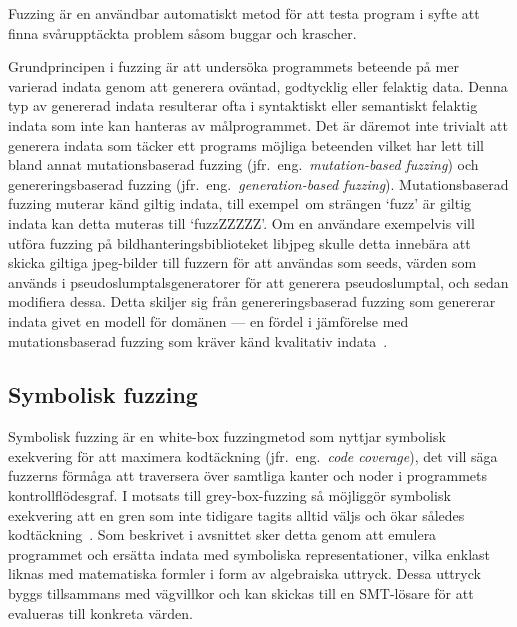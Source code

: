 Fuzzing är en användbar automatiskt metod för att testa program i syfte att finna
svårupptäckta problem såsom buggar och krascher.

Grundprincipen i fuzzing är att undersöka programmets beteende på mer varierad
indata genom att generera oväntad, godtycklig eller felaktig data. Denna typ av
genererad indata resulterar ofta i syntaktiskt eller semantiskt felaktig indata
som inte kan hanteras av målprogrammet. Det är däremot inte trivialt att generera
indata som täcker ett programs möjliga beteenden vilket har lett till bland annat
mutationsbaserad fuzzing (jfr.\ eng.\ \emph{mutation-based fuzzing}) och genereringsbaserad
fuzzing (jfr.\ eng.\ \emph{generation-based fuzzing}). Mutationsbaserad fuzzing muterar känd giltig indata,
till exempel\ om strängen `fuzz' är giltig indata kan detta muteras till `fuzzZZZZZ'. Om
en användare exempelvis vill utföra fuzzing på bildhanteringsbiblioteket libjpeg skulle
detta innebära att skicka giltiga jpeg-bilder till fuzzern för att användas som
seeds, värden som används i pseudoslumptalsgeneratorer för att generera
pseudoslumptal, och sedan modifiera dessa. Detta skiljer sig från
genereringsbaserad fuzzing som genererar indata givet en modell för domänen ---
en fördel i jämförelse med mutationsbaserad fuzzing som kräver känd kvalitativ
indata~\cite{fuzzing}.

\subsection{Symbolisk fuzzing} Symbolisk fuzzing är en white-box fuzzingmetod
som nyttjar symbolisk exekvering för att maximera kodtäckning (jfr.\ eng.\ \emph{code coverage}), det vill säga fuzzerns
förmåga att traversera över samtliga kanter och noder i programmets kontrollflödesgraf.
I motsats till grey-box-fuzzing så möjliggör symbolisk exekvering att en gren som inte tidigare tagits alltid väljs
och ökar således kodtäckning~\cite{challenges_fuzzing}. Som beskrivet i avsnittet 
sker detta genom att emulera programmet och ersätta indata med symboliska representationer, vilka enklast liknas med
matematiska formler i form av algebraiska uttryck. Dessa uttryck byggs tillsammans med vägvillkor
och kan skickas till en SMT-lösare för att evalueras till konkreta värden.

